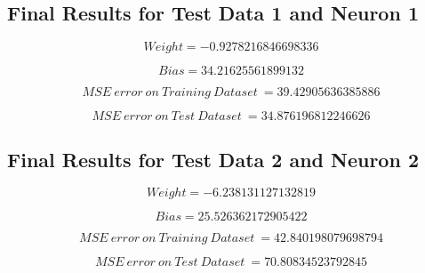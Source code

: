 \documentclass[a4paper, 12pt]{article}
\begin{document}
    \subsection{Final Results for Test Data 1 and Neuron 1}

    $$Weight = -0.9278216846698336$$

    $$Bias = 34.21625561899132$$

    $$MSE\ error\ on\ Training\ Dataset\ = 39.42905636385886$$

    $$MSE\ error\ on\ Test\ Dataset\ = 34.876196812246626$$

    \subsection{Final Results for Test Data 2 and Neuron 2}

    $$Weight = -6.238131127132819$$

    $$Bias = 25.526362172905422$$

    $$MSE\ error\ on\ Training\ Dataset\ = 42.840198079698794$$

    $$MSE\ error\ on\ Test\ Dataset\ = 70.80834523792845$$
\end{document}
